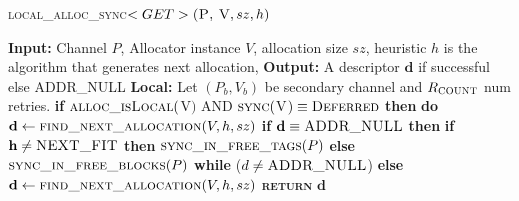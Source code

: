 \documentclass[10pt]{article}
\begin{document}

\begin{algorithm}{}
\footnotesize
\caption{\textsc{local\_alloc\_sync}{$<GET>\textsc{(P, V}, sz, h)$}}
\label{alg:lalloc_get} 
\begin{algorithmic}[1]


\STATE \textbf{Input:} Channel $P$, Allocator instance $V$, allocation size $sz$, heuristic $h$
is the algorithm that generates next allocation, 
\STATE \textbf{Output:} A descriptor {$\textbf{d}$} if successful else \textsc{ADDR\_NULL}
\STATE \textbf{Local:} Let $(P_{b}, V_{b})$ be secondary channel and $R_{\textsc{COUNT}}$ num retries.
\STATE \textbf{if} $\textsc{alloc\_isLocal}($V$)$ AND $\textsc{sync}($V$) \equiv \textsc{Deferred}$ \textbf{then} 
\STATE \quad \textbf{do}
\STATE \qquad $\textbf{d} \leftarrow  \textsc{find\_next\_allocation}(V, h, sz)$ 
\STATE \qquad \textbf{if} $\textbf{d} \equiv \textsc{ADDR\_NULL}$ \textbf{then}
\STATE \qquad \quad \textbf{if}  $\textbf{h} \neq \textsc{NEXT\_FIT}$ \textbf{then}
\STATE \qquad \qquad $\textsc{sync\_in\_free\_tags}(P)$
\STATE \qquad \quad \textbf{else} 
\STATE \qquad \qquad $\textsc{sync\_in\_free\_blocks}(P)$
\STATE \quad \textbf{while} ($d \neq \textsc{ADDR\_NULL}$)
\STATE \textbf{else}
\STATE \quad $\textbf{d} \leftarrow  \textsc{find\_next\_allocation}(V, h, sz)$ 
\STATE \textsc{\textbf{return}} {$\textbf{d}$}
\STATE


\end{algorithmic}
\end{algorithm}
\end{document}
